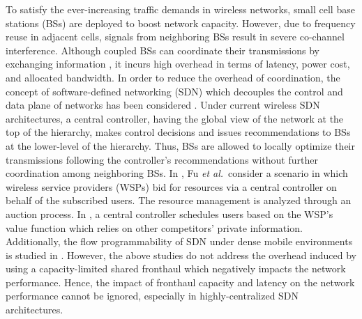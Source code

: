 \documentclass[conference]{IEEEtran}
\begin{document}
To satisfy the ever-increasing traffic demands in wireless networks, small cell base stations (BSs) are deployed to boost network capacity. However, due to frequency reuse in adjacent cells, signals from neighboring BSs result in severe co-channel interference. Although coupled BSs can coordinate their transmissions by exchanging information \cite{Chen:14:Mag}, it incurs high overhead in terms of latency, power cost, and allocated bandwidth.
In order to reduce the overhead of coordination, the concept of software-defined networking (SDN) which decouples the control and data plane of networks has been considered \cite{2015:SOF,Gudipati:13:SDN,Le2015}. Under current wireless SDN architectures,  a central controller, having the global view of the network at the top of the hierarchy, makes control decisions and issues recommendations to BSs at the lower-level of the hierarchy.
Thus, BSs are allowed to locally optimize their transmissions following the controller's recommendations without further coordination among neighboring BSs.
In \cite{Fu:2013:NVF}, Fu {\it et al.}~consider a scenario in which wireless service providers (WSPs) bid for resources via a central controller on behalf of the subscribed users. The resource management is analyzed through an auction process. In  \cite{Xianfu:SDN},  a central  controller schedules users based on the WSP's value function which relies on other competitors' private information. Additionally, the flow programmability of SDN under dense mobile environments is studied in \cite{Kozat:15:Flow}.
However, the above studies do not address the overhead induced  by using a capacity-limited shared fronthaul which negatively impacts the network performance.
Hence, the impact of fronthaul capacity and latency on the network performance cannot be ignored, especially in highly-centralized SDN architectures.
\end{document}
